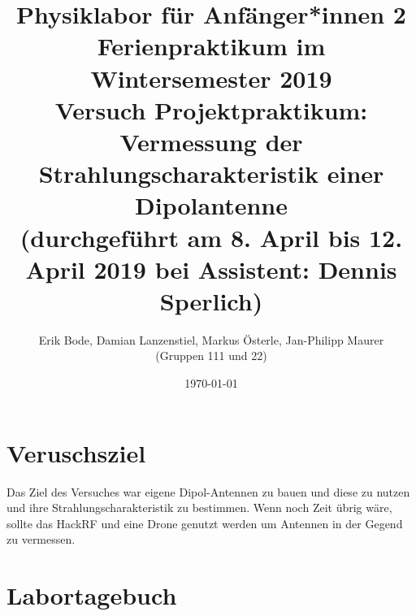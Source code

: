 \documentclass[titlepage,11pt,a4paper,ngerman]{article}
\begin{document}
\title{
	\large Physiklabor für Anfänger*innen 2 \\
	Ferienpraktikum im Wintersemester 2019 \\[4mm]
	\textbf{\LARGE 
		Versuch Projektpraktikum:\\[3mm]
		Vermessung der Strahlungscharakteristik einer Dipolantenne
			} \\[3mm]
	(durchgeführt am 8. April bis 12. April 2019 bei Assistent: Dennis Sperlich) \\}
\author{Erik Bode, Damian Lanzenstiel, Markus Österle, Jan-Philipp Maurer \\ (Gruppen 111 und 22)}
\date{\today}
\maketitle
\tableofcontents


\section{Veruschsziel}
Das Ziel des Versuches war eigene Dipol-Antennen zu bauen und diese zu nutzen und ihre Strahlungscharakteristik zu bestimmen. Wenn noch Zeit übrig wäre, sollte das HackRF und eine Drone genutzt werden um Antennen in der Gegend zu vermessen.

\section{Labortagebuch}
\end{document}
